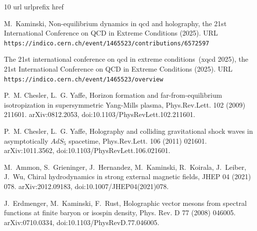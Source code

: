 \documentclass[preprint,12pt]{elsarticle}
\begin{document}
%
%

\begin{thebibliography}{10}
\expandafter\ifx\csname url\endcsname\relax
  \def\url#1{\texttt{#1}}\fi
\expandafter\ifx\csname urlprefix\endcsname\relax\def\urlprefix{URL }\fi
\expandafter\ifx\csname href\endcsname\relax
  \def\href#1#2{#2} \def\path#1{#1}\fi

M.~Kaminski,
  \href{https://indico.cern.ch/event/1465523/contributions/6572597}{Non-equilibrium
  dynamics in qcd and holography}, the 21st International Conference on QCD in
  Extreme Conditions (2025).
\newline\urlprefix\url{https://indico.cern.ch/event/1465523/contributions/6572597}

\href{https://indico.cern.ch/event/1465523/overview}{The 21st international
  conference on qcd in extreme conditions~(xqcd 2025)}, the 21st International
  Conference on QCD in Extreme Conditions (2025).
\newline\urlprefix\url{https://indico.cern.ch/event/1465523/overview}

P.~M. Chesler, L.~G. Yaffe, {Horizon formation and far-from-equilibrium
  isotropization in supersymmetric Yang-Mills plasma}, Phys.Rev.Lett. 102
  (2009) 211601.
\newblock \href {http://arxiv.org/abs/0812.2053} {\path{arXiv:0812.2053}},
  \href {https://doi.org/10.1103/PhysRevLett.102.211601}
  {\path{doi:10.1103/PhysRevLett.102.211601}}.

P.~M. Chesler, L.~G. Yaffe, {Holography and colliding gravitational shock waves
  in asymptotically $AdS_5$ spacetime}, Phys.Rev.Lett. 106 (2011) 021601.
\newblock \href {http://arxiv.org/abs/1011.3562} {\path{arXiv:1011.3562}},
  \href {https://doi.org/10.1103/PhysRevLett.106.021601}
  {\path{doi:10.1103/PhysRevLett.106.021601}}.

M.~Ammon, S.~Grieninger, J.~Hernandez, M.~Kaminski, R.~Koirala, J.~Leiber,
  J.~Wu, {Chiral hydrodynamics in strong external magnetic fields}, JHEP 04
  (2021) 078.
\newblock \href {http://arxiv.org/abs/2012.09183} {\path{arXiv:2012.09183}},
  \href {https://doi.org/10.1007/JHEP04(2021)078}
  {\path{doi:10.1007/JHEP04(2021)078}}.

J.~Erdmenger, M.~Kaminski, F.~Rust, {Holographic vector mesons from spectral
  functions at finite baryon or isospin density}, Phys. Rev. D 77 (2008)
  046005.
\newblock \href {http://arxiv.org/abs/0710.0334} {\path{arXiv:0710.0334}},
  \href {https://doi.org/10.1103/PhysRevD.77.046005}
  {\path{doi:10.1103/PhysRevD.77.046005}}.


\end{thebibliography}
\end{document}
